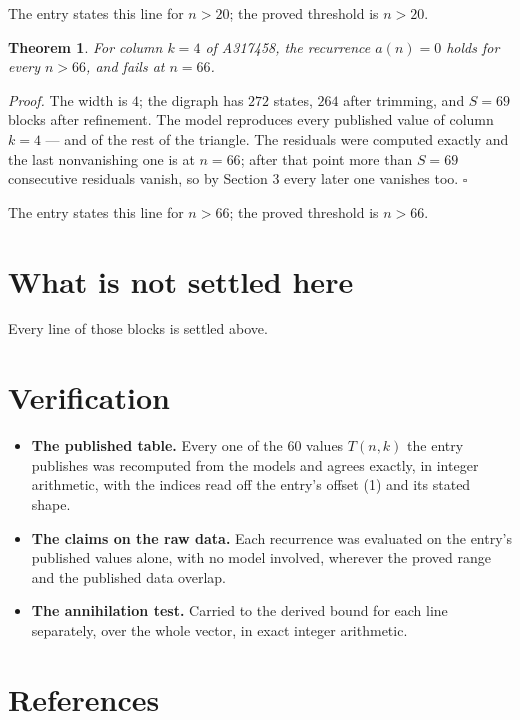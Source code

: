 \documentclass[11pt]{article}
\newtheorem{theorem}{Theorem}
\theoremstyle{definition}
\begin{document}
The entry states this line for $n > 20$; the proved threshold is $n > 20$.

\begin{theorem} For column $k = 4$ of A317458, the recurrence $a(n) = 0$ holds for every $n > 66$, and fails at $n = 66$.\end{theorem}

{\itshape Proof.} The width is $4$; the digraph has $272$ states, $264$ after trimming, and $S = 69$ blocks after refinement. The model reproduces every published value of column $k = 4$ --- and of the rest of the triangle. The residuals were computed exactly and the last nonvanishing one is at $n = 66$; after that point more than $S = 69$ consecutive residuals vanish, so by Section 3 every later one vanishes too. $\square$

The entry states this line for $n > 66$; the proved threshold is $n > 66$.

\section{What is not settled here}

Every line of those blocks is settled above.

\section{Verification}

\begin{itemize}

\item {\bfseries The published table.} Every one of the 60 values $T(n,k)$ the entry publishes was recomputed from the models and agrees exactly, in integer arithmetic, with the indices read off the entry's offset (1) and its stated shape.

\item {\bfseries The claims on the raw data.} Each recurrence was evaluated on the entry's published values alone, with no model involved, wherever the proved range and the published data overlap.

\item {\bfseries The annihilation test.} Carried to the derived bound for each line separately, over the whole vector, in exact integer arithmetic.

\end{itemize}

\section{References}
\end{document}
